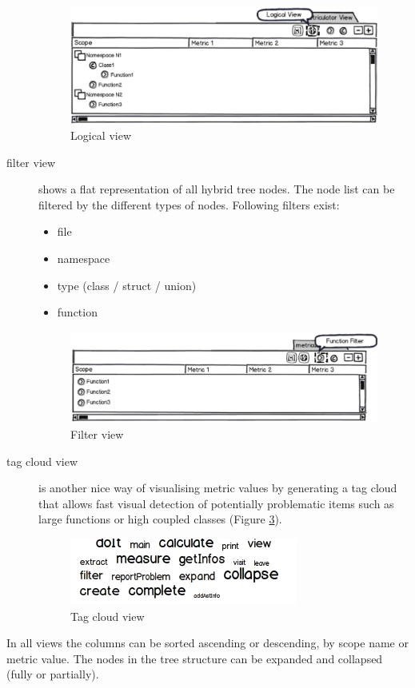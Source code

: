 \documentclass[11pt,a4paper,oneside]{scrreprt}
\begin{document}
\begin{description}
\begin{figure}[hp]
 \centering
 \includegraphics[scale=0.5]{figures/LogicalView.png}
 \caption{Logical view}
    \label{fig:logical_view}
\end{figure}

\item[filter view] shows a flat representation of all hybrid tree nodes. The node list can be filtered by the different types of nodes. Following filters exist:
\begin{itemize}
\item file
\item namespace
\item type (class / struct / union)
\item function
\end{itemize}
\begin{figure}[hp]
 \centering
 \includegraphics[scale=0.5]{figures/FilteredView.png}
 \caption{Filter view}
    \label{fig:filtered_view}
\end{figure}

\item[tag cloud view] is another nice way of visualising metric values by generating a tag cloud that allows fast visual detection of potentially problematic items such as large functions or high coupled classes (Figure \ref{fig:tag_cloud_mockup}).
\begin{figure}[th]
 \centering
 \includegraphics[scale=0.5]{figures/tag_cloud_mockup.png}
 \caption{Tag cloud view}
    \label{fig:tag_cloud_mockup}
\end{figure}

\end{description}
In all views the columns can be sorted ascending or descending, by scope name or metric value. The nodes in the tree structure can be expanded and collapsed (fully or partially).
\end{document}
